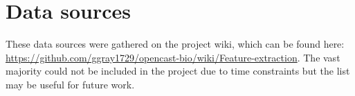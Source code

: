 \section{Data sources}
\label{datasources}

These data sources were gathered on the project wiki, which can be found here: \url{https://github.com/ggray1729/opencast-bio/wiki/Feature-extraction}.
The vast majority could not be included in the project due to time constraints but the list may be useful for future work.

